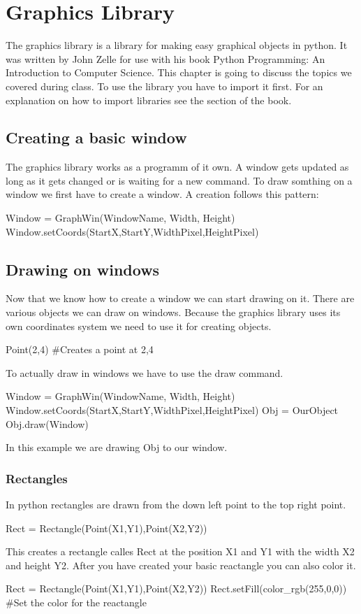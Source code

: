 \chapter{Graphics Library}

The graphics library is a library for making easy graphical objects in python. It was written by John Zelle for use with his book Python Programming: An
Introduction to Computer Science. This chapter is going to discuss the topics we covered during class. To use the library you have to import it first. For an explanation on how to import libraries see the section of the book.

\section{Creating a basic window}
The graphics library works as a programm of it own. A window gets updated as long as it gets changed or is waiting for a new command.
To draw somthing on a window we first have to create a window. A creation follows this pattern:
\begin{fullwidth}
\begin{python}
Window = GraphWin(WindowName, Width, Height)
Window.setCoords(StartX,StartY,WidthPixel,HeightPixel)
\end{python}
\end{fullwidth}

\section{Drawing on windows}
Now that we know how to create a window we can start drawing on it. There are various objects we can draw on windows. Because the graphics library uses its own coordinates system we need to use it for creating objects.
\begin{python}
Point(2,4) #Creates a point at 2,4
\end{python}
To actually draw in windows we have to use the draw command. 
\begin{python}
Window = GraphWin(WindowName, Width, Height)
Window.setCoords(StartX,StartY,WidthPixel,HeightPixel)
Obj = OurObject
Obj.draw(Window)
\end{python}
In this example we are drawing Obj to our window.

\subsection{Rectangles}
In python rectangles are drawn from the down left point to the top right point.
\begin{python}
Rect = Rectangle(Point(X1,Y1),Point(X2,Y2))
\end{python}
This creates a rectangle calles Rect at the position X1 and Y1 with the width X2 and height Y2. 
After you have created your basic reactangle you can also color it.
\begin{fullwidth}
\begin{python}
Rect = Rectangle(Point(X1,Y1),Point(X2,Y2))
Rect.setFill(color_rgb(255,0,0)) #Set the color for the reactangle
\end{python}
\end{fullwidth}
